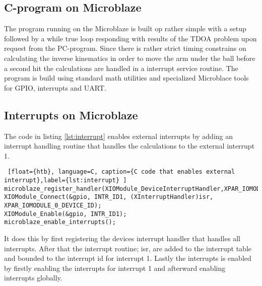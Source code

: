 \subsection{C-program on Microblaze}
The program running on the Microblaze is built op rather simple with a setup followed by a while true loop responding with results of the TDOA problem upon request from the PC-program. Since there is rather strict timing constrains on calculating the inverse kinematics in order to move the arm under the ball before a second hit the calculations are handled in a interrupt service routine. The program is build using standard math utilities and specialized Microblace tools for GPIO, interrupts and UART.
%
\subsection{Interrupts on Microblaze}
The code in listing \ref{lst:interrupt} enables external interrupts by adding an interrupt handling routine that handles the calculations to the external interrupt 1.
%
\begin{lstlisting} [float={htb}, language=C, caption={C code that enables external interrupt},label={lst:interrupt} ]
microblaze_register_handler(XIOModule_DeviceInterruptHandler,XPAR_IOMODULE_0_DEVICE_ID);
XIOModule_Connect(&gpio, INTR_ID1, (XInterruptHandler)isr, XPAR_IOMODULE_0_DEVICE_ID);
XIOModule_Enable(&gpio, INTR_ID1);
microblaze_enable_interrupts();
\end{lstlisting}
It does this by first registering the devices interrupt handler that handles all interrupts. After that the interrupt routine; isr, are added to the interrupt table and bounded to the interrupt id for interrupt 1. Lastly the interrupts is enabled by firstly enabling the interrupts for interrupt 1 and afterward enabling interrupts globally.
%
